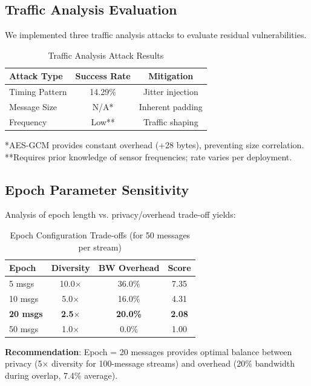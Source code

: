 \documentclass[conference]{IEEEtran}
\begin{document}
\subsection{Traffic Analysis Evaluation}

We implemented three traffic analysis attacks to evaluate residual vulnerabilities.

\begin{table}[htbp]
\caption{Traffic Analysis Attack Results}
\label{tab:traffic}
\centering
\begin{tabular}{lcc}
\toprule
\textbf{Attack Type} & \textbf{Success Rate} & \textbf{Mitigation} \\
\midrule
Timing Pattern & 14.29\% & Jitter injection \\
Message Size & N/A* & Inherent padding \\
Frequency & Low** & Traffic shaping \\
\bottomrule
\end{tabular}
\end{table}

*AES-GCM provides constant overhead (+28 bytes), preventing size correlation.
**Requires prior knowledge of sensor frequencies; rate varies per deployment.

\subsection{Epoch Parameter Sensitivity}

Analysis of epoch length vs. privacy/overhead trade-off yields:

\begin{table}[htbp]
\caption{Epoch Configuration Trade-offs (for 50 messages per stream)}
\label{tab:epoch}
\centering
\begin{tabular}{lccc}
\toprule
\textbf{Epoch} & \textbf{Diversity} & \textbf{BW Overhead} & \textbf{Score} \\
\midrule
5 msgs & 10.0$\times$ & 36.0\% & 7.35 \\
10 msgs & 5.0$\times$ & 16.0\% & 4.31 \\
\textbf{20 msgs} & \textbf{2.5$\times$} & \textbf{20.0\%} & \textbf{2.08} \\
50 msgs & 1.0$\times$ & 0.0\% & 1.00 \\
\bottomrule
\end{tabular}
\end{table}

\textbf{Recommendation}: Epoch = 20 messages provides optimal balance between privacy (5$\times$ diversity for 100-message streams) and overhead (20\% bandwidth during overlap, 7.4\% average).
\end{document}

